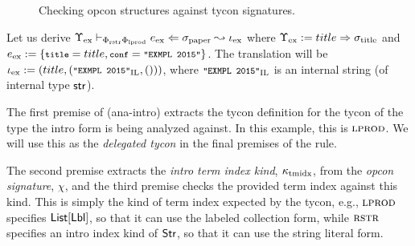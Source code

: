 \documentclass[10pt,preprint]{sigplanconf}
\begin{document}
\begin{figure*}[t]
\small\fbox{$\vdash_\Phi \omega \sim \psi$}
\vspace{-25px}
\begin{mathpar}\small
\hspace{50px}

\vspace{-5px}
\end{mathpar}
\caption{Checking opcon structures against tycon signatures.}
\label{ocstruct}\vspace{-5px}
\end{figure*}
Let us derive $\small\eana{\Upsilon_\text{ex}}{\Phi_\text{rstr}\Phi_\text{lprod}}{e_\text{ex}}{\stx{paper}}{\iota_\text{ex}}$ where $\small\Upsilon_\text{ex}  := title \Rightarrow \stx{title}$ and $\small e_\text{ex} := \{\conclbl{title}=title, \conclbl{conf}=\texttt{"EXMPL 2015"}\}$. The  translation will be $\small\iota_\text{ex} := (title, (\texttt{"EXMPL 2015"}_\text{IL}, ()))$, where $\small\texttt{"EXMPL 2015"}_\text{IL}$ is an internal string (of internal type $\keyw{str}$). 

The first premise of (ana-intro) extracts the tycon definition for the tycon of the type the intro form is being analyzed against. In this example, this is $\tcvar{lprod}$. We will use this as the \emph{delegated tycon} in the final premises of the rule.

The second premise extracts the \emph{intro term index kind}, $\klitidx$, from the \emph{opcon signature}, $\chi$, and the third premise checks the provided term index against this kind. This is simply the kind of term index expected by the tycon, e.g., $\tcvar{lprod}$ specifies $\klist{\klbl}$, so that it can use the labeled collection form, while $\tcvar{rstr}$ specifies an intro index kind of $\keyw{Str}$, so that it can use the string literal form. %
\end{document}
